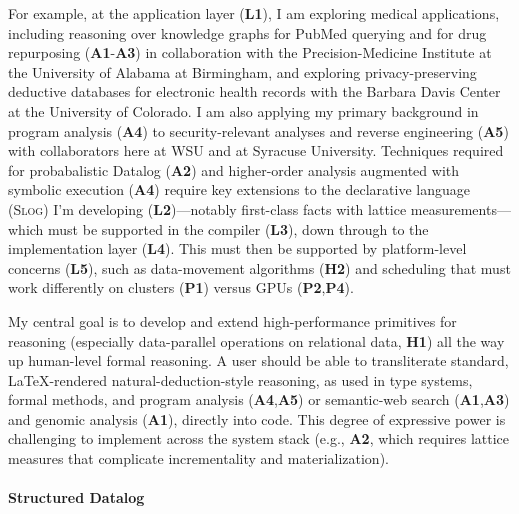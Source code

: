 \documentclass[12pt]{article}
\begin{document}
For example, at the application layer (\textbf{L1}), I am exploring medical applications, including reasoning over knowledge graphs for PubMed querying and for drug repurposing (\textbf{A1}-\textbf{A3}) in collaboration with the Precision-Medicine Institute at the University of Alabama at Birmingham, and exploring privacy-preserving deductive databases for electronic health records with the Barbara Davis Center at the University of Colorado. I am also applying my primary background in program analysis (\textbf{A4}) to security-relevant analyses and reverse engineering (\textbf{A5}) with collaborators here at WSU and at Syracuse University. Techniques required for probabalistic Datalog (\textbf{A2}) and higher-order analysis augmented with symbolic execution (\textbf{A4}) require key extensions to the declarative language (\textsc{Slog}) I'm developing (\textbf{L2})---notably first-class facts with lattice measurements---which must be supported in the compiler (\textbf{L3}), down through to the implementation layer (\textbf{L4}). This must then be supported by platform-level concerns (\textbf{L5}), such as data-movement algorithms (\textbf{H2}) and scheduling that must work differently on clusters (\textbf{P1}) versus GPUs (\textbf{P2},\textbf{P4}).

My central goal is to develop and extend high-performance primitives for reasoning (especially data-parallel operations on relational data, \textbf{H1}) all the way up human-level formal reasoning. A user should be able to transliterate standard, \LaTeX-rendered natural-deduction-style reasoning, as used in type systems, formal methods, and program analysis (\textbf{A4},\textbf{A5}) or semantic-web search (\textbf{A1},\textbf{A3}) and genomic analysis (\textbf{A1}), directly into code. This degree of expressive power is challenging to implement across the system stack (e.g., \textbf{A2}, which requires lattice measures that complicate incrementality and materialization).


\paragraph{Structured Datalog}
\end{document}
